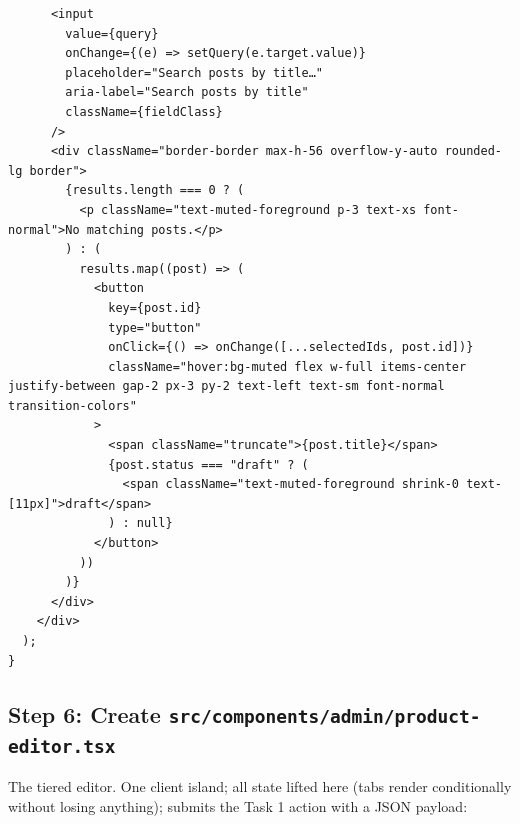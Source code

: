 \documentclass[11pt,a4paper]{article}
\begin{document}
\begin{lstlisting}
      <input
        value={query}
        onChange={(e) => setQuery(e.target.value)}
        placeholder="Search posts by title…"
        aria-label="Search posts by title"
        className={fieldClass}
      />
      <div className="border-border max-h-56 overflow-y-auto rounded-lg border">
        {results.length === 0 ? (
          <p className="text-muted-foreground p-3 text-xs font-normal">No matching posts.</p>
        ) : (
          results.map((post) => (
            <button
              key={post.id}
              type="button"
              onClick={() => onChange([...selectedIds, post.id])}
              className="hover:bg-muted flex w-full items-center justify-between gap-2 px-3 py-2 text-left text-sm font-normal transition-colors"
            >
              <span className="truncate">{post.title}</span>
              {post.status === "draft" ? (
                <span className="text-muted-foreground shrink-0 text-[11px]">draft</span>
              ) : null}
            </button>
          ))
        )}
      </div>
    </div>
  );
}
\end{lstlisting}

\subsection*{Step 6: Create \texttt{src/components/admin/product-editor.tsx}}

The tiered editor. One client island; all state lifted here (tabs render conditionally without losing
anything); submits the Task 1 action with a JSON payload:
\end{document}
